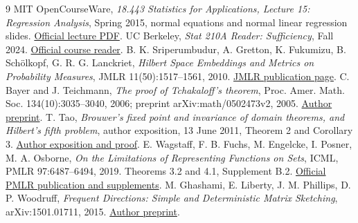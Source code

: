 \documentclass[11pt]{article}
\begin{document}
\begin{thebibliography}{9}
MIT OpenCourseWare, \emph{18.443 Statistics for Applications,
Lecture 15: Regression Analysis}, Spring 2015, normal equations
and normal linear regression slides.
\href{https://ocw.mit.edu/courses/18-443-statistics-for-applications-spring-2015/986e5778fc7d3a4c2bb4fdf8ceb4c28d_MIT18_443S15_LEC15.pdf}{Official lecture PDF}.
UC Berkeley, \emph{Stat 210A Reader: Sufficiency}, Fall 2024.
\href{https://stat210a.berkeley.edu/fall-2024/reader/sufficiency.html}{Official course reader}.
B. K. Sriperumbudur, A. Gretton, K. Fukumizu, B. Sch\"olkopf,
G. R. G. Lanckriet, \emph{Hilbert Space Embeddings and Metrics on
Probability Measures}, JMLR 11(50):1517--1561, 2010.
\href{https://www.jmlr.org/papers/v11/sriperumbudur10a.html}{JMLR publication page}.
C. Bayer and J. Teichmann, \emph{The proof of Tchakaloff's theorem},
Proc. Amer. Math. Soc. 134(10):3035--3040, 2006;
preprint arXiv:math/0502473v2, 2005.
\href{https://arxiv.org/abs/math/0502473}{Author preprint}.
T. Tao, \emph{Brouwer's fixed point and invariance of domain theorems,
and Hilbert's fifth problem}, author exposition, 13 June 2011,
Theorem 2 and Corollary 3.
\href{https://terrytao.wordpress.com/2011/06/13/brouwers-fixed-point-and-invariance-of-domain-theorems-and-hilberts-fifth-problem/}{Author exposition and proof}.
E. Wagstaff, F. B. Fuchs, M. Engelcke, I. Posner, M. A. Osborne,
\emph{On the Limitations of Representing Functions on Sets},
ICML, PMLR 97:6487--6494, 2019. Theorems 3.2 and 4.1,
Supplement B.2.
\href{https://proceedings.mlr.press/v97/wagstaff19a.html}{Official PMLR publication and supplements}.
M. Ghashami, E. Liberty, J. M. Phillips, D. P. Woodruff,
\emph{Frequent Directions: Simple and Deterministic Matrix Sketching},
arXiv:1501.01711, 2015.
\href{https://arxiv.org/abs/1501.01711}{Author preprint}.
\end{thebibliography}
\end{document}
